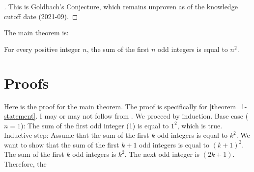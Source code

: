 \documentclass{article}
\begin{document}
\begin{proof}[\hypertarget{lemma_1-proof}Proof of \autoref{lemma_1-statement}]
\label{lemma_1-proof}
This is Goldbach's Conjecture, which remains unproven as of the knowledge cutoff date (2021-09).
\end{proof}

The main theorem is:
\begin{theorem}[theorem_1]
\label{theorem_1-statement}
For every positive integer $n$, the sum of the first $n$ odd integers is equal to $n^2$.
\end{theorem}

\section{Proofs}
\label{sec:proofs}
Here is the proof for the main theorem. The proof is specifically for \autoref{theorem_1-statement}. I may or may not follow from \cite{rudelsonSparseReconstructionFourier2008}.
We proceed by induction.
Base case ($n = 1$): The sum of the first odd integer (1) is equal to $1^2$, which is true.
Inductive step: Assume that the sum of the first $k$ odd integers is equal to $k^2$. We want to show that the sum of the first $k+1$ odd integers is equal to $(k+1)^2$.
The sum of the first $k$ odd integers is $k^2$. The next odd integer is $(2k+1)$. Therefore, the

\printbibliography
\end{document}
